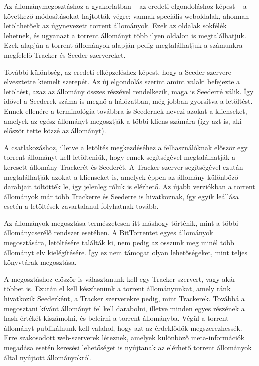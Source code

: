\documentclass[a4paper]{article}
\begin{document}
Az állománymegosztáshoz a gyakorlatban – az eredeti elgondoláshoz képest – a következő módosításokat hajtották végre:
vannak speciális weboldalak, ahonnan letölthetőek az úgynevezett torrent állományok. Ezek az oldalak sokfélék lehetnek,
és ugyanazt a torrent állományt több ilyen oldalon is megtalálhatjuk. Ezek alapján a torrent állományok alapján pedig
megtalálhatjuk a számunkra megfelelő Tracker és Seeder szervereket.

További különbség, az eredeti elképzeléshez képest, hogy a Seeder szervere elvesztette kiemelt szerepét. Az új
elgondolás szerint amint valaki befejezte a letöltést, azaz az állomány összes részével rendelkezik, maga is Seederré
válik. Így idővel a Seederek száma is megnő a hálózatban, még jobban gyorsítva a letöltést. Ennek ellenére a
terminológia továbbra is Seedernek nevezi azokat a klienseket, amelyek az egész állományt megosztják a többi kliens
számára (így azt is, aki először tette közzé az állományt).

A csatlakozáshoz, illetve a letöltés megkezdéséhez a felhasználóknak először egy torrent állományt kell letölteniük,
hogy ennek segítségével megtalálhatják a keresett állomány Trackerét és Seederét. A Tracker szerver segítségével ezután
megtalálhatják azokat a klienseket is, amelyek éppen az állomány különböző darabjait töltötték le, így jelenleg róluk
is elérhető. Az újabb verziókban a torrent állományok már több Trackerre és Seederre is hivatkoznak, így egyik leállása
esetén a letöltések zavartalanul folyhatnak tovább.

Az állományok megosztása természetesen itt máshogy történik, mint a többi állománycserélő rendszer esetében. A
BitTorrentet egyes állományok megosztására, letöltésére találták ki, nem pedig az osszunk meg minél több állományt elv
kielégítésére. Így ez nem támogat olyan lehetőségeket, mint teljes könyvtárak megosztása.

A megosztáshoz először is választanunk kell egy Tracker szervert, vagy akár többet is. Ezután el kell készítenünk a
torrent állományunkat, amely ránk hivatkozik Seederként, a Tracker szerverekre pedig, mint Trackerek. Továbbá a
megosztani kívánt állományt fel kell darabolni, illetve minden egyes részének a hash értékét kiszámolni, és beleírni a
torrent állományba. Végül a torrent állományt publikálnunk kell valahol, hogy azt az érdeklődők megszerezhessék. Erre
szakosodott web-szerverek léteznek, amelyek különböző meta-információk megadása esetén keresési lehetőséget is
nyújtanak az elérhető torrent állományok által nyújtott állományokról.
\end{document}

